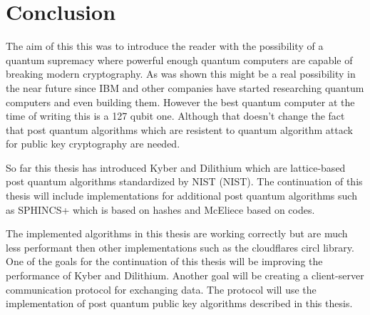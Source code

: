 \chapter*{Conclusion}
{}

The aim of this this was to introduce the reader with the possibility of a quantum supremacy where powerful enough quantum computers are capable of breaking modern cryptography. As was shown this might be a real possibility in the near future since IBM and other companies have started researching quantum computers and even building them. However the best quantum computer at the time of writing this is a 127 qubit one. Although that doesn't change the fact that post quantum algorithms which are resistent to quantum algorithm attack for public key cryptography are needed.

So far this thesis has introduced Kyber and Dilithium which are lattice-based post quantum algorithms standardized by NIST (\acl{NIST}). The continuation of this thesis will include implementations for additional post quantum algorithms such as SPHINCS+ which is based on hashes and McEliece based on codes.

The implemented algorithms in this thesis are working correctly but are much less performant then other implementations such as the cloudflares circl library. One of the goals for the continuation of this thesis will be improving the performance of Kyber and Dilithium. Another goal will be creating a client-server communication protocol for exchanging data. The protocol will use the implementation of post quantum public key algorithms described in this thesis.
